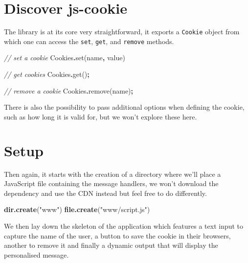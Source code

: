 \documentclass[
]{krantz}
\makeatletter
\newenvironment{Shaded}{\begin{snugshade}}{\end{snugshade}}
\newcommand{\CommentTok}[1]{\textcolor[rgb]{0.37,0.37,0.37}{\textit{#1}}}
\newcommand{\FunctionTok}[1]{\textcolor[rgb]{0,0,0}{#1}}
\newcommand{\KeywordTok}[1]{\textcolor[rgb]{0.27,0.27,0.27}{\textbf{#1}}}
\newcommand{\NormalTok}[1]{#1}
\newcommand{\OperatorTok}[1]{\textcolor[rgb]{0.43,0.43,0.43}{\textbf{#1}}}
\newcommand{\StringTok}[1]{\textcolor[rgb]{0.5,0.5,0.5}{#1}}
\newenvironment{kframe}{%
\medskip{}
\setlength{\fboxsep}{.8em}
 \def\at@end@of@kframe{}%
 \ifinner\ifhmode%
  \def\at@end@of@kframe{\end{minipage}}%
  \begin{minipage}{\columnwidth}%
 \fi\fi%
 \def\FrameCommand##1{\hskip\@totalleftmargin \hskip-\fboxsep
 \colorbox{shadecolor}{##1}\hskip-\fboxsep
     \hskip-\linewidth \hskip-\@totalleftmargin \hskip\columnwidth}%
 \MakeFramed {\advance\hsize-\width
   \@totalleftmargin\z@ \linewidth\hsize
   \@setminipage}}%
 {\par\unskip\endMakeFramed%
 \at@end@of@kframe}
\renewenvironment{Shaded}{\begin{kframe}}{\end{kframe}}
\makeatother
\begin{document}
\hypertarget{discover-js-cookie}{%
\section*{Discover js-cookie}\label{discover-js-cookie}}


The library is at its core very straightforward, it exports a \texttt{Cookie} object from which one can access the \texttt{set}, \texttt{get}, and \texttt{remove} methods.

\begin{Shaded}
\begin{Highlighting}[]
\CommentTok{// set a cookie}
\NormalTok{Cookies}\OperatorTok{.}\FunctionTok{set}\NormalTok{(}\StringTok{\textquotesingle{}name\textquotesingle{}}\OperatorTok{,} \StringTok{\textquotesingle{}value\textquotesingle{}}\NormalTok{)}

\CommentTok{// get cookies}
\NormalTok{Cookies}\OperatorTok{.}\FunctionTok{get}\NormalTok{()}\OperatorTok{;}

\CommentTok{// remove a cookie}
\NormalTok{Cookies}\OperatorTok{.}\FunctionTok{remove}\NormalTok{(}\StringTok{\textquotesingle{}name\textquotesingle{}}\NormalTok{)}\OperatorTok{;}
\end{Highlighting}
\end{Shaded}

There is also the possibility to pass additional options when defining the cookie, such as how long it is valid for, but we won't explore these here.

\hypertarget{setup-2}{%
\section*{Setup}\label{setup-2}}


Then again, it starts with the creation of a directory where we'll place a JavaScript file containing the message handlers, we won't download the dependency and use the CDN instead but feel free to do differently.

\begin{Shaded}
\begin{Highlighting}[]
\KeywordTok{dir.create}\NormalTok{(}\StringTok{"www"}\NormalTok{)}
\KeywordTok{file.create}\NormalTok{(}\StringTok{"www/script.js"}\NormalTok{)}
\end{Highlighting}
\end{Shaded}

We then lay down the skeleton of the application which features a text input to capture the name of the user, a button to save the cookie in their browsers, another to remove it and finally a dynamic output that will display the personalised message.
\end{document}
